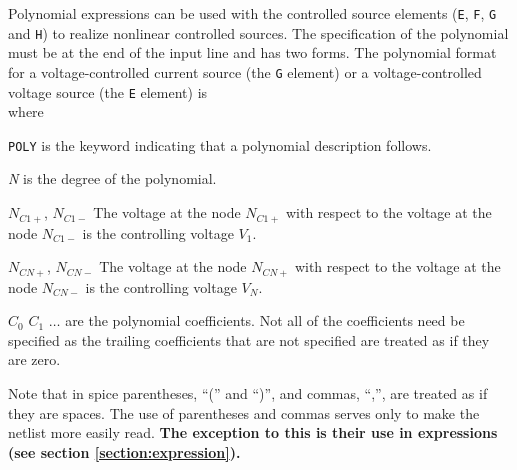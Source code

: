 Polynomial expressions can be used with the controlled source
elements ({\tt E}, {\tt F}, {\tt G} and {\tt H}) to realize
nonlinear controlled sources. The specification of the polynomial
must be at the end of the input line and has two forms. The
polynomial format for a voltage-controlled current source (the
{\tt G} element)
or a voltage-controlled voltage source (the {\tt E} element) is\\[0.1in]
\hspace*{\fill}
where
\begin{widelist}
\item[{\tt POLY}] is the keyword indicating that a polynomial description
follows.
\item[{\it N}] is the degree of the polynomial.
\item[$N_{C1+}$, $N_{C1-}$]The voltage at the node
$N_{C1+}$ with respect to the voltage at the node
$N_{C1-}$ is the controlling voltage $V_1$.
\item[$N_{CN+}$, $N_{CN-}$]The voltage at the node
$N_{CN+}$ with respect to the voltage at the node
$N_{CN-}$ is the controlling voltage $V_N$.
\item[$C_0$ $C_1$ $\ldots$] are the polynomial coefficients. Not all of the
coefficients need be specified as the trailing coefficients that are not
specified are treated as if they are zero.
\end{widelist}
Note that in spice parentheses, ``('' and ``)'', and commas, ``,'', are treated
as if they are spaces.  The use of
parentheses and commas serves only to make the netlist more easily read.
{\bf The exception to this is their use in expressions (see section
\ref{section:expression}).}

